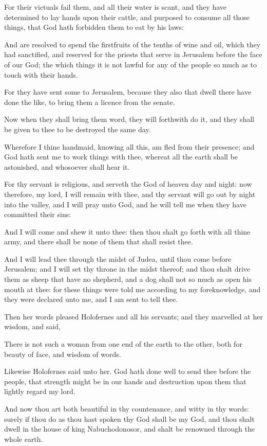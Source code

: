 {\par }{\PP {}For their victuals fail them, and all their water is scant, and they have determined to lay hands upon their cattle, and purposed to consume all those things, that God hath forbidden them to eat by his laws:
\par }{\PP {}And are resolved to spend the firstfruits of the tenths of wine and oil, which they had sanctified, and reserved for the priests that serve in Jerusalem before the face of our God; the which things it is not lawful for any of the people so much as to touch with their hands.
\par }{\PP {}For they have sent some to Jerusalem, because they also that dwell there have done the like, to bring them a licence from the senate.
\par }{\PP {}Now when they shall bring them word, they will forthwith do it, and they shall be given to thee to be destroyed the same day.
\par }{\PP {}Wherefore I thine handmaid, knowing all this, am fled from their presence; and God hath sent me to work things with thee, whereat all the earth shall be astonished, and whosoever shall hear it.
\par }{\PP {}For thy servant is religious, and serveth the God of heaven day and night: now therefore, my lord, I will remain with thee, and thy servant will go out by night into the valley, and I will pray unto God, and he will tell me when they have committed their sins:
\par }{\PP {}And I will come and shew it unto thee: then thou shalt go forth with all thine army, and there shall be none of them that shall resist thee.
\par }{\PP {}And I will lead thee through the midst of Judea, until thou come before Jerusalem; and I will set thy throne in the midst thereof; and thou shalt drive them as sheep that have no shepherd, and a dog shall not so much as open his mouth at thee: for these things were told me according to my foreknowledge, and they were declared unto me, and I am sent to tell thee.
\par }{\PP {}Then her words pleased Holofernes and all his servants; and they marvelled at her wisdom, and said,
\par }{\PP {}There is not such a woman from one end of the earth to the other, both for beauty of face, and wisdom of words.
\par }{\PP {}Likewise Holofernes said unto her. God hath done well to send thee before the people, that strength might be in our hands and destruction upon them that lightly regard my lord.
\par }{\PP {}And now thou art both beautiful in thy countenance, and witty in thy words: surely if thou do as thou hast spoken thy God shall be my God, and thou shalt dwell in the house of king Nabuchodonosor, and shalt be renowned through the whole earth.

}
